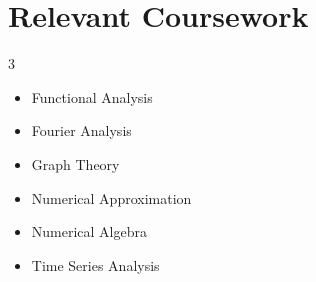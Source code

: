 \documentclass[a4paper,11pt]{article}
\begin{document}
\vspace{2pt}
\section{\bfseries{Relevant Coursework}}
\begin{multicols}{3}
    \begin{itemize}
        \item\small Functional Analysis
        \item\small Fourier Analysis
        \item\small Graph Theory 
        \item\small Numerical Approximation
        \item\small Numerical Algebra
        \item\small Time Series Analysis 
    \end{itemize}
\end{multicols}
\end{document}
